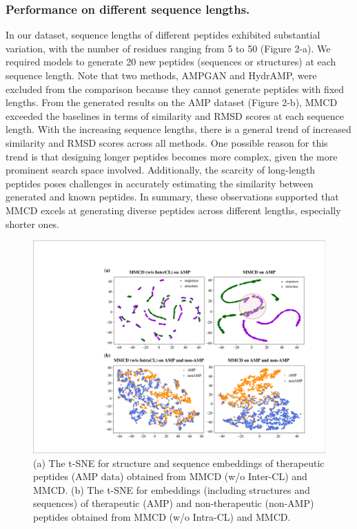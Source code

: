 \documentclass[letterpaper]{article} %
\begin{document}
\subsubsection{Performance on different sequence lengths.}
In our dataset, sequence lengths of different peptides exhibited substantial variation, with the number of residues ranging from 5 to 50 (Figure 2-a). We required models to generate 20 new peptides (sequences or structures) at each sequence length. Note that two methods, AMPGAN and HydrAMP, were excluded from the comparison because they cannot generate peptides with fixed lengths. From the generated results on the AMP dataset (Figure 2-b), MMCD exceeded the baselines in terms of similarity and RMSD scores at each sequence length. With the increasing sequence lengths, there is a general trend of increased similarity and RMSD scores across all methods. One possible reason for this trend is that designing longer peptides becomes more complex, given the more prominent search space involved. Additionally, the scarcity of long-length peptides poses challenges in accurately estimating the similarity between generated and known peptides. In summary, these observations supported that MMCD excels at generating diverse peptides across different lengths, especially shorter ones.

\begin{figure}[h]
\includegraphics[scale=0.3]{fig3.pdf}
\caption{(a) The t-SNE for structure and sequence embeddings of therapeutic peptides (AMP data) obtained from MMCD (w/o Inter-CL) and MMCD. (b) The t-SNE for embeddings (including structures and sequences) of therapeutic (AMP) and non-therapeutic (non-AMP) peptides obtained from MMCD (w/o Intra-CL) and MMCD.}
\end{figure}
\end{document}
